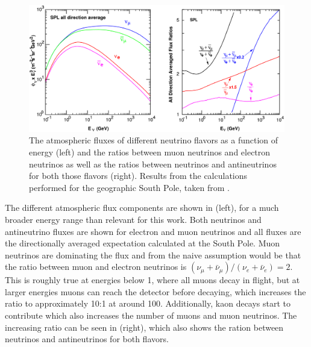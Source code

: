 \begin{figure}
    \centering
    \includegraphics[width=1.0\textwidth]{figures/neutrinos_properties/Honda_alldir-spl_copy.pdf}
    \caption[Atmospheric neutrino fluxes]{The atmospheric fluxes of different neutrino flavors as a function of energy (left) and the ratios between muon neutrinos and electron neutrinos as well as the ratios between neutrinos and antineutrinos for both those flavors (right). Results from the calculations performed for the geographic South Pole, taken from \cite{PhysRevD.92.023004_Honda_Flux}.}
\end{figure}

The different atmospheric flux components are shown in  (left), for a much broader energy range than relevant for this work. Both neutrinos and antineutrino fluxes are shown for electron  and muon neutrinos and all fluxes are the directionally averaged expectation calculated at the South Pole. Muon neutrinos are dominating the flux and from  the naive assumption would be that the ratio between muon and electron neutrinos is $(\nu_\mu+\bar{\nu}_\mu)/(\nu_e+\bar{\nu}_e)=2$. This is roughly true at energies below \SI{1}{\gev}, where all muons decay in flight, but at larger energies muons can reach the detector before decaying, which increases the ratio to approximately 10:1 at around \SI{100}{\gev}. Additionally, kaon decays start to contribute which also increases the number of muons and muon neutrinos. The increasing ratio can be seen in  (right), which also shows the ration between neutrinos and antineutrinos for both flavors.

